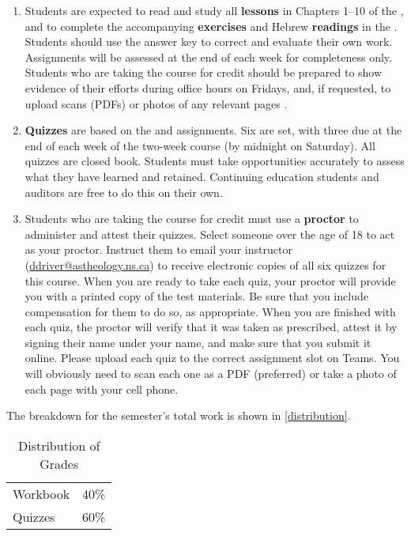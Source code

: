 \documentclass[titlepage]{article}
\begin{document}
\begin{enumerate}
 \item
    Students are expected to read and study all \textbf{lessons} in
    Chapters 1–10 of the \cite{lbh}, and to complete the accompanying
    \textbf{exercises} and Hebrew \textbf{readings} in the \cite{work}.
    Students should use the answer key to correct and evaluate their own
    work. Assignments will be assessed at the end of each week for
    completeness only. Students who are taking the course for credit
    should be prepared to show evidence of their efforts during office
    hours on Fridays, and, if requested, to upload scans (PDFs) or
    photos of any relevant pages \cite[3–34, 79–101]{work}.
 \item
    \textbf{Quizzes} are based on the \cite{lbh} and \cite{work}
    assignments. Six are set, with three due at the end of each week of
    the two-week course (by midnight on Saturday). All quizzes are
    closed book. Students must take opportunities accurately to assess
    what they have learned and retained. Continuing education students
    and auditors are free to do this on their own.
 \item
    Students who are taking the course for credit must use a
    \textbf{proctor} to administer and attest their quizzes. Select
    someone over the age of 18 to act as your proctor. Instruct them to
    email your instructor
    (\href{mailto:ddriver@astheology.ns.ca}{ddriver@astheology.ns.ca})
    to receive electronic copies of all six quizzes for this course.
    When you are ready to take each quiz, your proctor will provide you
    with a printed copy of the test materials. Be sure that you include
    compensation for them to do so, as appropriate. When you are
    finished with each quiz, the proctor will verify that it was taken
    as prescribed, attest it by signing their name under your name, and
    make sure that you submit it online. Please upload each quiz to the
    correct assignment slot on Teams. You will obviously need to scan
    each one as a PDF (preferred) or take a photo of each page with your
    cell phone.
\end{enumerate}

The breakdown for the semester's total work is shown in
\autoref{distribution}.

\begin{table}[htbp]
  \centering
  {\lining
  \begin{tabular}{lr}
    \toprule
    Workbook & 40\% \\
    Quizzes  & 60\% \\
    \bottomrule
  \end{tabular}}
  \caption{Distribution of Grades}
  \label{distribution}
\end{table}
\end{document}
